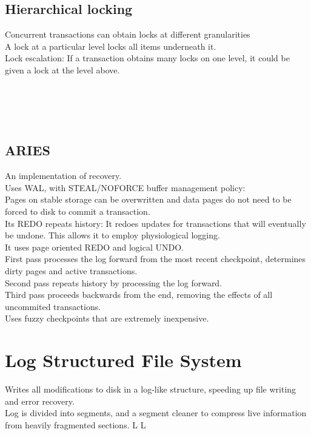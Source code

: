 \subsection{Hierarchical locking}
Concurrent transactions can obtain locks at different granularities\\
A lock at a particular level locks all items underneath it.\\
Lock escalation: If a transaction obtains many locks on one level, it could be given a lock at the level above.\\
\\
\\
\\
\\
\subsection{ARIES}
An implementation of recovery. \\
Uses WAL, with STEAL/NOFORCE buffer management policy:\\
Pages on stable storage can be overwritten and data pages do not need to be forced to disk to commit a transaction. \\
Its REDO repeats history: It redoes updates for transactions that will eventually be undone. This allows it to employ physiological logging.\\
It uses page oriented REDO and logical UNDO.\\
First pass processes the log forward from the most recent checkpoint, determines dirty pages and active transactions. \\
Second pass repeats history by processing the log forward.\\
Third pass proceeds backwards from the end, removing the effects of all uncommited transactions.\\
Uses fuzzy checkpoints that are extremely inexpensive.
\section{Log Structured File System}
Writes all modifications to disk in a log-like structure, speeding up file writing and error recovery.\\
Log is divided into segments, and a segment cleaner to compress live information from heavily fragmented sections.
\vfill \smallskip
\supereject
\if L\lr \else\null\vfill\eject\fi
\if L\lr \else\null\vfill\eject\fi
\bye

